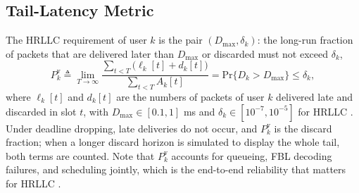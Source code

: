\documentclass[journal]{IEEEtran}
\renewcommand{\Pr}{\mathrm{Pr}}
\newcommand{\Dmax}{D_{\max}}
\begin{document}
\subsection{Tail-Latency Metric}
The HRLLC requirement of user $k$ is the pair $(\Dmax,\delta_k)$: the long-run fraction of packets that are delivered later than $\Dmax$ or discarded must not exceed $\delta_k$,
\begin{equation}\label{eq:tail}
P_k^{\mathrm v}\triangleq\lim_{T\to\infty}\frac{\sum_{t<T}\big(\ell_k[t]+d_k[t]\big)}{\sum_{t<T}A_k[t]}=\Pr\{D_k>\Dmax\}\le\delta_k,
\end{equation}
where $\ell_k[t]$ and $d_k[t]$ are the numbers of packets of user $k$ delivered late and discarded in slot $t$, with $\Dmax\in[0.1,1]$ ms and $\delta_k\in[10^{-7},10^{-5}]$ for HRLLC \cite{ITUR-M2160}. Under deadline dropping, late deliveries do not occur, and $P_k^{\mathrm v}$ is the discard fraction; when a longer discard horizon is simulated to display the whole tail, both terms are counted. Note that $P_k^{\mathrm v}$ accounts for queueing, FBL decoding failures, and scheduling jointly, which is the end-to-end reliability that matters for HRLLC \cite{She2018CrossLayer}.

\end{document}
